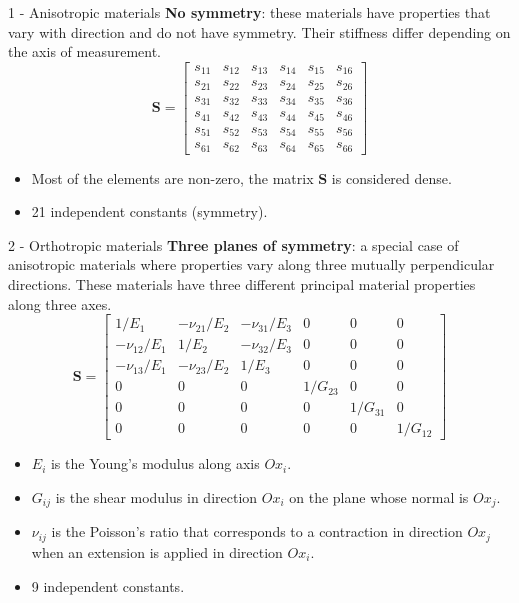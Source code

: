 \documentclass[aspectratio=169]{beamer}
\begin{document}
\begin{frame}{1 - Anisotropic materials}
  \textbf{No symmetry}: these materials have properties that vary with direction and do not have symmetry. Their stiffness differ depending on the axis of measurement.
  \vspace{0.2cm}
  {\small $$\mathbf S=\begin{bmatrix} s_{11} & s_{12} & s_{13} & s_{14} & s_{15} & s_{16} \\ s_{21} & s_{22} & s_{23} & s_{24} & s_{25} & s_{26} \\ s_{31} & s_{32} & s_{33} & s_{34} & s_{35} & s_{36} \\ s_{41} & s_{42} & s_{43} & s_{44} & s_{45} & s_{46}\\ s_{51} & s_{52} & s_{53} & s_{54} & s_{55} & s_{56}\\ s_{61} & s_{62} & s_{63} & s_{64} & s_{65} & s_{66} \end{bmatrix}$$}
  \begin{itemize}
    \item Most of the elements are non-zero, the matrix $\mathbf S$ is considered dense.
    \item 21 independent constants (symmetry).
  \end{itemize}
\end{frame}

\begin{frame}{2 - Orthotropic materials}
  \textbf{Three planes of symmetry}: a special case of anisotropic materials where properties vary along three mutually perpendicular directions. These materials have three different principal material properties along three axes.
  \vspace{0.2cm}
  {\small $$\mathbf S=\begin{bmatrix} 1/E_1 & -\nu_{21}/E_2 & -\nu_{31}/E_3 & 0 & 0 & 0 \\  -\nu_{12}/E_1 & 1/E_2  & -\nu_{32}/E_3  & 0 & 0 & 0 \\ -\nu_{13}/E_1 & -\nu_{23}/E_2 & 1/E_3 & 0 & 0 & 0 \\ 0 & 0 & 0 & 1/G_{23} & 0 & 0 \\ 0 & 0 & 0 & 0 & 1/G_{31} & 0 \\ 0 & 0 & 0 & 0 & 0 & 1/G_{12} \end{bmatrix}$$}
  \begin{itemize}
    \item $E_{i}$ is the Young's modulus along axis $Ox_{i}$.
    \item $G_{ij}$ is the shear modulus in direction $Ox_{i}$ on the plane whose normal is $Ox_{j}$.
    \item $\nu_{ij}$ is the Poisson's ratio that corresponds to a contraction in direction $Ox_{j}$ when an extension is applied in direction $Ox_{i}$.
    \item 9 independent constants.
  \end{itemize}
\end{frame}
\end{document}
